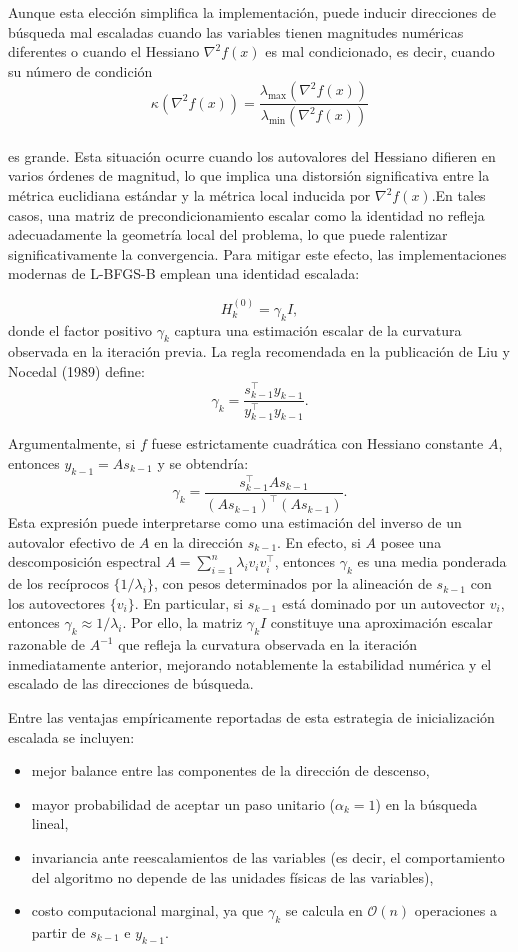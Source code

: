 \documentclass[
  spanish,
  us-letterpaper,
]{scrreprt}
\providecommand{\tightlist}{%
  \setlength{\itemsep}{0pt}\setlength{\parskip}{0pt}}
\numberwithin{equation}{section}
\begin{document}
Aunque esta elección simplifica la implementación, puede inducir
direcciones de búsqueda mal escaladas cuando las variables tienen
magnitudes numéricas diferentes o cuando el Hessiano \(\nabla^2 f(x)\)
es mal condicionado, es decir, cuando su número de condición\\
\[
\kappa(\nabla^2 f(x)) = \frac{\lambda_{\max}(\nabla^2 f(x))}{\lambda_{\min}(\nabla^2 f(x))}
\]\\
es grande. Esta situación ocurre cuando los autovalores del Hessiano
difieren en varios órdenes de magnitud, lo que implica una distorsión
significativa entre la métrica euclidiana estándar y la métrica local
inducida por \(\nabla^2 f(x)\).En tales casos, una matriz de
precondicionamiento escalar como la identidad no refleja adecuadamente
la geometría local del problema, lo que puede ralentizar
significativamente la convergencia. Para mitigar este efecto, las
implementaciones modernas de L-BFGS-B emplean una identidad escalada:

\[
H_k^{(0)} = \gamma_k I,
\] donde el factor positivo \(\gamma_k\) captura una estimación escalar
de la curvatura observada en la iteración previa. La regla recomendada
en la publicación de Liu y Nocedal (1989) define: \[
\gamma_k = \frac{s_{k-1}^{\top} y_{k-1}}{y_{k-1}^{\top} y_{k-1}}.
\]

Argumentalmente, si \(f\) fuese estrictamente cuadrática con Hessiano
constante \(A\), entonces \(y_{k-1} = A s_{k-1}\) y se obtendría: \[
\gamma_k
=
\frac{s_{k-1}^{\top} A s_{k-1}}
     {(A s_{k-1})^{\top} (A s_{k-1})}.
\] Esta expresión puede interpretarse como una estimación del inverso de
un autovalor efectivo de \(A\) en la dirección \(s_{k-1}\). En efecto,
si \(A\) posee una descomposición espectral
\(A = \sum_{i=1}^n \lambda_i v_i v_i^\top\), entonces \(\gamma_k\) es
una media ponderada de los recíprocos \(\{1/\lambda_i\}\), con pesos
determinados por la alineación de \(s_{k-1}\) con los autovectores
\(\{v_i\}\). En particular, si \(s_{k-1}\) está dominado por un
autovector \(v_i\), entonces \(\gamma_k \approx 1/\lambda_i\). Por ello,
la matriz \(\gamma_k I\) constituye una aproximación escalar razonable
de \(A^{-1}\) que refleja la curvatura observada en la iteración
inmediatamente anterior, mejorando notablemente la estabilidad numérica
y el escalado de las direcciones de búsqueda.

Entre las ventajas empíricamente reportadas de esta estrategia de
inicialización escalada se incluyen:

\begin{itemize}
\tightlist
\item
  mejor balance entre las componentes de la dirección de descenso,
\item
  mayor probabilidad de aceptar un paso unitario (\(\alpha_k = 1\)) en
  la búsqueda lineal,
\item
  invariancia ante reescalamientos de las variables (es decir, el
  comportamiento del algoritmo no depende de las unidades físicas de las
  variables),
\item
  costo computacional marginal, ya que \(\gamma_k\) se calcula en
  \(\mathcal{O}(n)\) operaciones a partir de \(s_{k-1}\) e \(y_{k-1}\).
\end{itemize}
\end{document}
